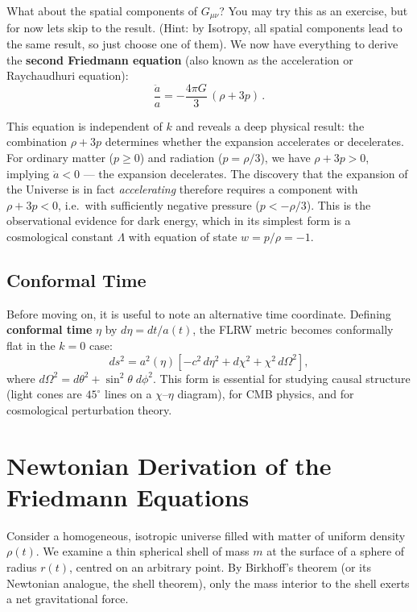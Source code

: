 What about the spatial components of $G_{\mu\nu}$? You may try this as an exercise, but for now lets skip to the result. (Hint: by Isotropy, all spatial components lead to the same result, so just choose one of them). We now have everything to derive the \textbf{second Friedmann equation} (also known as the acceleration or Raychaudhuri equation):
\begin{equation}
\boxed{\frac{\ddot{a}}{a} = -\frac{4\pi G}{3}\,(\rho+3p)\,.}
\end{equation}

This equation is independent of $k$ and reveals a deep physical result: the combination $\rho+3p$ determines whether the expansion accelerates or decelerates. For ordinary matter ($p\geq 0$) and radiation ($p=\rho/3$), we have $\rho+3p>0$, implying $\ddot{a}<0$ --- the expansion decelerates. The discovery that the expansion of the Universe is in fact \emph{accelerating} therefore requires a component with $\rho+3p<0$, i.e.\ with sufficiently negative pressure ($p<-\rho/3$). This is the observational evidence for dark energy, which in its simplest form is a cosmological constant $\Lambda$ with equation of state $w=p/\rho=-1$.

\subsection{Conformal Time}

Before moving on, it is useful to note an alternative time coordinate. Defining \textbf{conformal time} $\eta$ by $d\eta = dt/a(t)$, the FLRW metric becomes conformally flat in the $k=0$ case:
\begin{equation}
    ds^{2} = a^{2}(\eta)\!\left[-c^{2}\,d\eta^{2}
    + d\chi^{2} + \chi^{2}\,d\Omega^{2}\right],
    \label{eq:conformal}
\end{equation}
where $d\Omega^{2} = d\theta^{2} + \sin^{2}\!\theta\;d\phi^{2}$. This form is essential for studying causal structure (light cones are $45^{\circ}$ lines on a $\chi$--$\eta$ diagram), for CMB physics, and for cosmological perturbation theory.


\section{Newtonian Derivation of the Friedmann Equations}

Consider a homogeneous, isotropic universe filled with matter of uniform density $\rho(t)$. We examine a thin spherical shell of mass $m$ at the surface of a sphere of radius $r(t)$, centred on an arbitrary point. By Birkhoff's theorem (or its Newtonian analogue, the shell theorem), only the mass interior to the shell exerts a net gravitational force.

